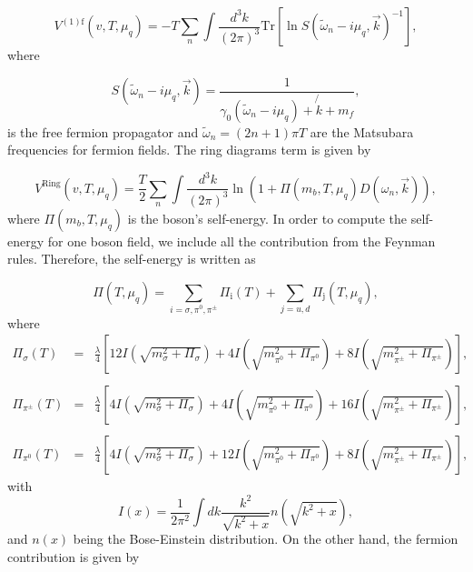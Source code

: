 \documentclass[%
 reprint,
showpacs,preprintnumbers,
 amsmath,amssymb,
onecolumn]{revtex4}
\begin{document}
\begin{equation}
    V^{(1)\text{f}}(v,T,\mu_q)=-T\sum_n\int\frac{d^3k}{(2\pi)^3} \text{Tr}[\ln S(\tilde{\omega}_n-i\mu_q,\vec{k})^{-1}],
    \label{1loopfermion}
\end{equation}
where

\begin{equation}
S(\tilde{\omega}_n-i\mu_q,\vec{k})=\frac{1}{\gamma_0 \left (\tilde{\omega}_n-i\mu_q\right )+\not{\!k}+m_f},
\end{equation}
is the free fermion propagator and $\tilde{\omega}_n=(2n+1)\pi T$ are the Matsubara frequencies for fermion fields. The ring diagrams term is given by

\begin{equation}
    V^{\text{Ring}}(v,T,\mu_q)=\frac{T}{2}\sum_n\int\frac{d^3k}{(2\pi)^3}\ln (1+\Pi(m_b,T,\mu_q)D(\omega_n,\vec{k})),
    \label{rings}
\end{equation}
where $\Pi(m_b,T,\mu_q)$ is the boson's self-energy. In order to compute the self-energy for one boson field, we include all the contribution from the Feynman rules. Therefore, the self-energy is written as

\begin{equation}
    \Pi(T,\mu_q)=\sum_{i=\sigma, \pi^0,\pi^\pm}\Pi_{\text{i}}(T)+\sum_{j=u,d}\Pi_{\text{j}}(T,\mu_q),
\end{equation}
where
\begin{eqnarray}	
    \Pi_\sigma(T)&=&\frac{\lambda}{4}\left [12 I\left (\sqrt{m_\sigma^2+\Pi_\sigma}\right )+4I\left (\sqrt{m^2_{\pi^0}+\Pi_{\pi^0}}\right ) +8I\left (\sqrt{m^2_{\pi^\pm}+\Pi_{\pi^\pm}}\right )\right ],\nonumber \\
&&\nonumber \\
    \Pi_{\pi^\pm}(T)&=&\frac{\lambda}{4}\left [4 I\left (\sqrt{m_\sigma^2+\Pi_\sigma}\right )+4I\left (\sqrt{m^2_{\pi^0}+\Pi_{\pi^0}}\right ) +16I\left (\sqrt{m^2_{\pi^\pm}+\Pi_{\pi^\pm}}\right )\right ],\nonumber \\
&&\nonumber \\
    \Pi_{\pi^0}(T)&=&\frac{\lambda}{4}\left [4 I\left (\sqrt{m_\sigma^2+\Pi_\sigma}\right )+12I\left (\sqrt{m^2_{\pi^0}+\Pi_{\pi^0}}\right ) + 8I\left (\sqrt{m^2_{\pi^\pm}+\Pi_{\pi^\pm}}\right )\right ],
\end{eqnarray}
with
\begin{equation}
    I(x)=\frac{1}{2\pi^2}\int dk \frac{k^2}{\sqrt{k^2+x}} n\left (\sqrt{k^2+x}\right ),
\end{equation}
and $n(x)$ being the Bose-Einstein distribution. On the other hand, the fermion contribution is given by
\end{document}
